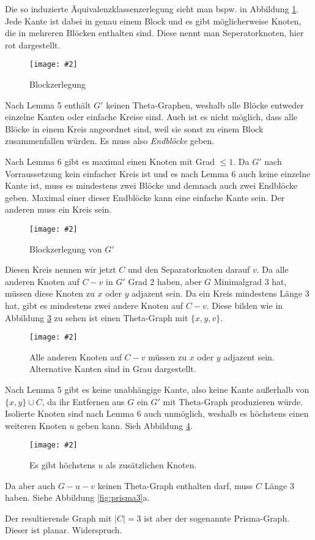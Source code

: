 \documentclass[10pt,a4paper]{article}
\makeatletter
\def\maxwidth#1{\ifdim\Gin@nat@width>#1 #1\else\Gin@nat@width\fi}
\newcommand{\imageFigure}[4]{%
    \begin{figure}[h]%
        \centering%
        {%
            \setlength{\fboxsep}{1pt}%
            \setlength{\fboxrule}{1pt}%
            \texttt{[image: \#2]}%
        }%
        \caption{#1}%
        \label{fig:#4}%
    \end{figure}%
}
\makeatother
\begin{document}
Die so induzierte Äquivalenzklassenzerlegung sieht man bspw. in Abbildung
\ref{fig:block1}.
Jede Kante ist dabei in genau einem Block und es gibt möglicherweise Knoten,
die in mehreren Blöcken enthalten sind.
Diese nennt man Seperatorknoten, hier rot dargestellt.

\imageFigure{Blockzerlegung}{block1.png}{.7}{block1}

Nach Lemma 5 enthält $G'$ keinen Theta-Graphen, weshalb alle Blöcke entweder
einzelne Kanten oder einfache Kreise sind.
Auch ist es nicht möglich, dass alle Blöcke in einem Kreis angeordnet sind,
weil sie sonst zu einem Block zusammenfallen würden.
Es muss also \textit{Endblöcke} geben.

Nach Lemma 6 gibt es maximal einen Knoten mit Grad $\leq 1$.
Da $G'$ nach Vorraussetzung kein einfacher Kreis ist und es nach Lemma 6 auch
keine einzelne Kante ist, muss es mindestens zwei Blöcke und demnach auch zwei
Endblöcke geben.
Maximal einer dieser Endblöcke kann eine einfache Kante sein.
Der anderen muss ein Kreis sein.

\imageFigure{Blockzerlegung von $G'$}{block2.png}{.7}{block2}

Diesen Kreis nennen wir jetzt $C$ und den Separatorknoten darauf $v$.
Da alle anderen Knoten auf $C - v$ in $G'$ Grad 2 haben, aber $G$ Minimalgrad 3
hat, müssen diese Knoten zu $x$ oder $y$ adjazent sein.
Da ein Kreis mindestens Länge 3 hat, gibt es mindestens zwei andere Knoten auf
$C - v$.
Diese bilden wie in Abbildung \ref{fig:prisma1} zu sehen ist einen Theta-Graph
mit $\{x, y, v\}$.

\imageFigure{Alle anderen Knoten auf $C-v$ müssen zu $x$ oder $y$ adjazent
sein.
Alternative Kanten sind in Grau dargestellt.
}{prisma1.png}{.5}{prisma1}

Nach Lemma 5 gibt es keine unabhängige Kante, also keine Kante außerhalb von
$\{x, y\} \cup C$, da ihr Entfernen aus $G$ ein $G'$ mit Theta-Graph
produzieren würde.
Isolierte Knoten sind nach Lemma 6 auch unmöglich, weshalb es höchstens einen
weiteren Knoten $u$ geben kann.
Sieh Abbildung \ref{fig:prisma2}.

\imageFigure{Es gibt höchstens $u$ als zusätzlichen
Knoten.}{prisma2.png}{.4}{prisma2}

Da aber auch $G-u-v$ keinen Theta-Graph enthalten darf, muss $C$ Länge 3 haben.
Siehe Abbildung \ref{fig:prisma3}a.

Der resultierende Graph mit $|C| = 3$ ist aber der sogenannte Prisma-Graph.
Dieser ist planar. Widerspruch.
\end{document}
